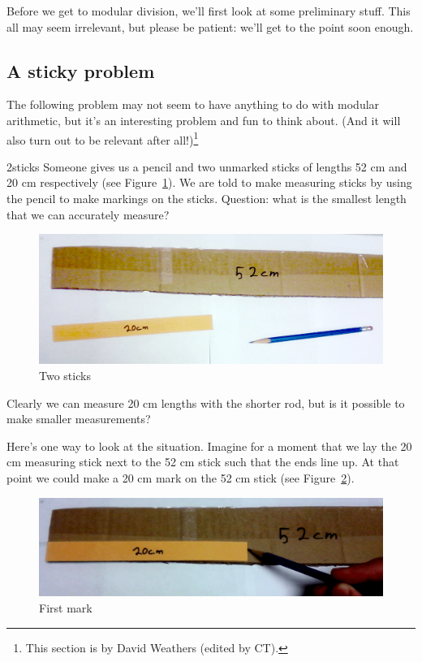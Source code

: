  Before we get to modular division, we'll first look at some preliminary stuff. This all may seem irrelevant, but  please be patient: we'll get to the point soon enough.
 
 
\subsection{A sticky problem}
The following problem may not seem to have anything to do with modular arithmetic, but it's an interesting problem and fun to think about. (And it will also turn out to be relevant after all!)\footnote{This section is by David Weathers (edited by CT).}

\begin{example}{2sticks} Someone gives us a pencil and two unmarked sticks of lengths 52 cm and  20 cm respectively (see Figure~\ref{fig:1euclidean}). We are told to make measuring sticks by using the pencil to make markings on the sticks. Question: what is the smallest length that we can accurately measure? 
\begin{figure}
\begin {center} 
\includegraphics[width=1.00\textwidth]{images/2_sticks_step1.png}
\end {center}
\caption{Two sticks\label{fig:1euclidean}}
\end{figure}
Clearly we can measure 20 cm lengths with the shorter rod, but is it possible to make smaller measurements?

Here's one way to look at the situation. Imagine for a moment that we lay the 20 cm measuring stick next to the 52 cm stick such that the ends line up.  At that point we could make a 20 cm mark on the 52 cm stick (see Figure~\ref{fig:2}).
\begin{figure}
\begin {center} 
\includegraphics[width=1.00\textwidth]{images/2_sticks_step2.png}
\end {center}
\caption{First mark\label{fig:2}}
\end{figure}


\end{example}
